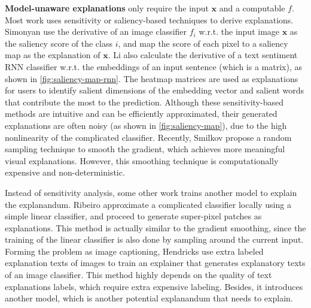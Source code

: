 \textbf{Model-unaware explanations} only require the input $\mathbf{x}$ and a computable $f$. Most work uses sensitivity or saliency-based techniques to derive explanations. Simonyan \etal \cite{simonyan14saliency} use the derivative of an image classifier $f_i$ w.r.t. the input image $\mathbf{x}$ as the saliency score of the class $i$, and map the score of each pixel to a saliency map as the explanation of $\mathbf{x}$. Li \etal \cite{li2016naccl-hlt} also calculate the derivative of a text sentiment RNN classifier w.r.t. the embeddings of an input sentence (which is a matrix), as shown in \autoref{fig:saliency-map-rnn}. The heatmap matrices are used as explanations for users to identify salient dimensions of the embedding vector and salient words that contribute the most to the prediction. Although these sensitivity-based methods are intuitive and can be efficiently approximated, their generated explanations are often noisy (as shown in \autoref{fig:saliency-map}), due to the high nonlinearity of the complicated classifier. Recently, Smilkov \etal \cite{smilkov2017smoothgrad} propose a random sampling technique to smooth the gradient, which achieves more meaningful visual explanations. However, this smoothing technique is computationally expensive and non-deterministic.

Instead of sensitivity analysis, some other work trains another model to explain the explanandum. Ribeiro \etal \cite{ribeiro2016kdd} approximate a complicated classifier locally using a simple linear classifier, and proceed to generate super-pixel patches as explanations. This method is actually similar to the gradient smoothing, since the training of the linear classifier is also done by sampling around the current input. Forming the problem as image captioning, Hendricks \etal \cite{hendricks16generate} use extra labeled explanation texts of images to train an explainer that generates explanatory texts of an image classifier. This method highly depends on the quality of text explanations labels, which require extra expensive labeling. Besides, it introduces another model, which is another potential explanandum that needs to explain.



